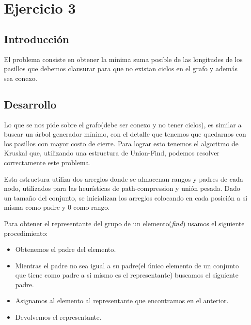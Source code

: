 \section{Ejercicio 3}

\subsection{Introducción}

El problema consiste en obtener la mínima suma posible de las longitudes de los pasillos que debemos clausurar para que no existan ciclos en el grafo y además sea conexo. 

\subsection{Desarrollo}
\label{des-ej3}

Lo que se nos pide sobre el grafo(debe ser conexo y no tener ciclos), es similar a buscar un árbol generador mínimo, con el detalle que tenemos que quedarnos con los pasillos
con mayor costo de cierre. Para lograr esto tenemos el algoritmo de Kruskal que, utilizando una estructura de Union-Find, podemos resolver correctamente este problema. 

\begin{comment}
Esta estructura utiliza dos diccionarios parametrizados con el tipo de los rótulos de los vértices, que almacenan rangos y padres de cada nodo, utilizados para las heurísticas de path-compression y union pesada. Estos diccionarios se implementan sobre la estructura TreeMap, que garantiza acceso e inserción con costo logarítmico.

La inicialización de la misma toma una lista de los elementos y les asigna a todos rango 0 y los pone como padre de si mismo. 
\end{comment}

Esta estructura utiliza dos arreglos donde se almacenan rangos y padres de cada nodo, utilizados para las heurísticas de path-compression y unión pesada.
Dado un tamaño del conjunto, se inicializan los arreglos colocando en cada posición a si misma como padre y 0 como rango.

Para obtener el representante del grupo de un elemento(\textit{find}) usamos el siguiente procedimiento:

\begin{itemize}
    \item Obtenemos el padre del elemento.
    \item Mientras el padre no sea igual a su padre(el único elemento de un conjunto que tiene como padre a si mismo es el representante) buscamos el siguiente padre.
    \item Asignamos al elemento al representante que encontramos en el anterior.
    \item Devolvemos el representante.
\end{itemize}


